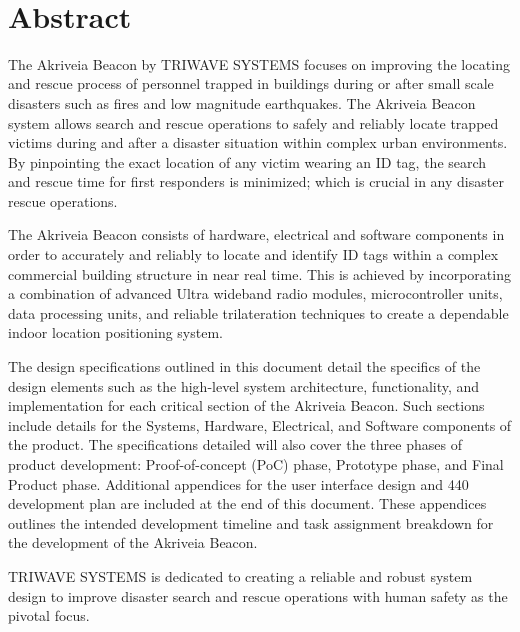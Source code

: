 
\
\section*{Abstract}	%

\bigskip
The Akriveia Beacon by TRIWAVE SYSTEMS focuses on improving the locating and rescue
process of personnel trapped in buildings during or after small scale disasters such as fires and
low magnitude earthquakes. The Akriveia Beacon system allows search and rescue operations to safely and reliably locate trapped victims during and after a disaster situation within complex urban environments. By pinpointing the exact location of any victim wearing an ID tag, the search and rescue time for first responders is minimized; which is crucial in any disaster rescue operations.

\bigskip
The Akriveia Beacon consists of hardware, electrical and software components in order to accurately and reliably to locate and identify ID tags within a complex commercial building structure in near real time. This is achieved by incorporating a combination of advanced Ultra wideband radio modules, microcontroller units, data processing units, and reliable trilateration techniques to create a dependable indoor location positioning system. 

\bigskip
The design specifications outlined in this document detail the specifics of the design elements such as the high-level system architecture, functionality, and implementation for each critical section of the Akriveia Beacon. Such sections include details for the Systems, Hardware, Electrical, and Software components of the product. The specifications detailed will also cover the three phases of product development: Proof-of-concept (PoC) phase, Prototype phase, and Final Product phase. Additional appendices for the user interface design and 440 development plan are included at the end of this document. These appendices outlines the intended development timeline and task assignment breakdown for the development of the Akriveia Beacon.

\bigskip
TRIWAVE SYSTEMS is dedicated to creating a reliable and robust system design to improve disaster search and rescue operations with human safety as the pivotal focus.
